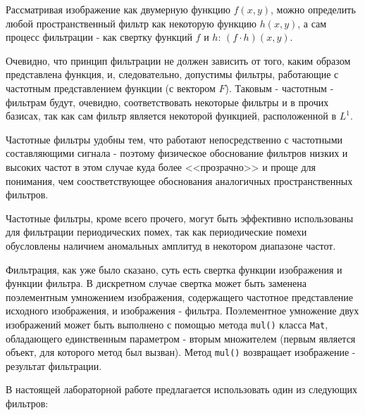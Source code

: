 
Рассматривая изображение как двумерную функцию $f(x, y)$, можно определить любой пространственный фильтр как некоторую функцию $h(x, y)$, а сам процесс фильтрации - как свертку функций $f$ и $h$: $(f \cdot h)(x, y)$.

Очевидно, что принцип фильтрации не должен зависить от того, каким образом представлена функция, и, следовательно, допустимы фильтры, работающие с частотным представлением функции (с вектором $F$). Таковым - частотным - фильтрам будут, очевидно, соответствовать некоторые фильтры и в прочих базисах, так как сам фильтр является некоторой функцией, расположенной в $L^1$.

Частотные фильтры удобны тем, что работают непосредственно с частотными составляющими сигнала - поэтому физическое обоснование фильтров низких и высоких частот в этом случае куда более <<прозрачно>> и проще для понимания, чем соостветствующее обоснования аналогичных пространственных фильтров.

Частотные фильтры, кроме всего прочего, могут быть эффективно использованы для фильтрации периодических помех, так как периодические помехи обусловлены наличием аномальных амплитуд в некотором диапазоне частот.

Фильтрация, как уже было сказано, суть есть свертка функции изображения и функции фильтра. В дискретном случае свертка может быть заменена поэлементным умножением изображения, содержащего частотное представление исходного изображения, и изображения - фильтра. Поэлементное умножение двух изображений может быть выполнено с помощью метода \verb|mul()| класса \verb|Mat|, обладающего единственным параметром - вторым множителем (первым является объект, для которого метод был вызван). Метод \verb|mul()| возвращает изображение - результат фильтрации.

В настоящей лабораторной работе предлагается использовать один из следующих фильтров:

